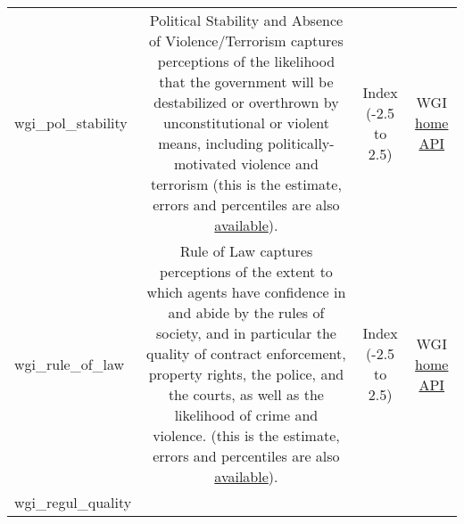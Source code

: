 \documentclass[]{article}
\begin{document}
\begin{longtable}[]{@{}lccc@{}}
\begin{minipage}[t]{0.14\columnwidth}\raggedright\strut
wgi\_pol\_stability\strut
\end{minipage} & \begin{minipage}[t]{0.36\columnwidth}\centering\strut
Political Stability and Absence of Violence/Terrorism captures
perceptions of the likelihood that the government will be destabilized
or overthrown by unconstitutional or violent means, including
politically-motivated violence and terrorism (this is the estimate,
errors and percentiles are also
\href{https://info.worldbank.org/governance/wgi/\#home}{available}).\strut
\end{minipage} & \begin{minipage}[t]{0.24\columnwidth}\centering\strut
Index (-2.5 to 2.5)\strut
\end{minipage} & \begin{minipage}[t]{0.15\columnwidth}\centering\strut
WGI \href{https://info.worldbank.org/governance/wgi/\#home}{home}
\href{https://api.worldbank.org/v2/sources/3/indicators}{API}\strut
\end{minipage}\tabularnewline
\begin{minipage}[t]{0.14\columnwidth}\raggedright\strut
wgi\_rule\_of\_law\strut
\end{minipage} & \begin{minipage}[t]{0.36\columnwidth}\centering\strut
Rule of Law captures perceptions of the extent to which agents have
confidence in and abide by the rules of society, and in particular the
quality of contract enforcement, property rights, the police, and the
courts, as well as the likelihood of crime and violence. (this is the
estimate, errors and percentiles are also
\href{https://info.worldbank.org/governance/wgi/\#home}{available}).\strut
\end{minipage} & \begin{minipage}[t]{0.24\columnwidth}\centering\strut
Index (-2.5 to 2.5)\strut
\end{minipage} & \begin{minipage}[t]{0.15\columnwidth}\centering\strut
WGI \href{https://info.worldbank.org/governance/wgi/\#home}{home}
\href{https://api.worldbank.org/v2/sources/3/indicators}{API}\strut
\end{minipage}\tabularnewline
\begin{minipage}[t]{0.14\columnwidth}\raggedright\strut
wgi\_regul\_quality\strut
\end{minipage} & \begin{minipage}[t]{0.36\columnwidth}\centering\strut

\end{minipage}
\end{longtable}
\end{document}
